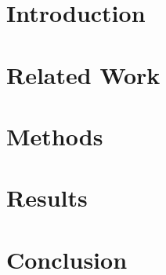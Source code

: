 \documentclass[12pt]{article}
\begin{document}
\maketitle

\begin{abstract}
	
\end{abstract}

\section{Introduction}
\label{sec:introduction}


\section{Related Work}
\label{sec:related}


\section{Methods}
\label{sec:methods}


\section{Results}
\label{sec:results}


\section{Conclusion}
\label{sec:conclusion}





\end{document}
